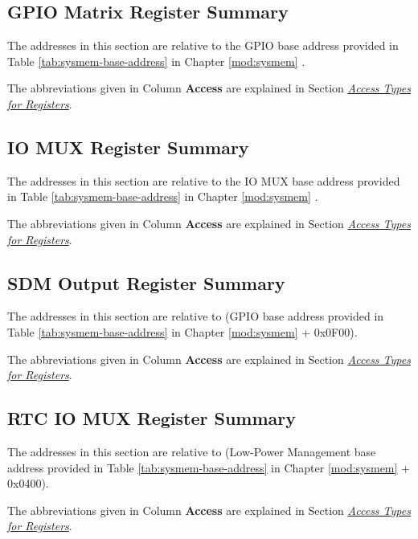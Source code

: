 \documentclass[main\_\_EN.tex]{subfiles}
\begin{document}
\subsection{GPIO Matrix Register Summary}
\label{section:4.12}
The addresses in this section are relative to the GPIO base address provided in Table \ref{tab:sysmem-base-address} in Chapter \ref{mod:sysmem} \textit{}.

The abbreviations given in Column \textbf{Access} are explained in Section \hyperref[glossary-access-types]{\textit{Access Types for Registers}}.




\subsection{IO MUX Register Summary}
The addresses in this section are relative to the IO MUX base address provided in Table \ref{tab:sysmem-base-address} in Chapter \ref{mod:sysmem} \textit{}.

The abbreviations given in Column \textbf{Access} are explained in Section \hyperref[glossary-access-types]{\textit{Access Types for Registers}}.




\subsection{SDM Output Register Summary}
The addresses in this section are relative to (GPIO base address provided in Table \ref{tab:sysmem-base-address} in Chapter \ref{mod:sysmem} \textit{} + 0x{}0F00).

The abbreviations given in Column \textbf{Access} are explained in Section \hyperref[glossary-access-types]{\textit{Access Types for Registers}}.




\subsection{RTC IO MUX Register Summary}
The addresses in this section are relative to (Low-Power Management base address provided in Table \ref{tab:sysmem-base-address} in Chapter \ref{mod:sysmem} \textit{} + 0x{}0400).

The abbreviations given in Column \textbf{Access} are explained in Section \hyperref[glossary-access-types]{\textit{Access Types for Registers}}.
\end{document}
